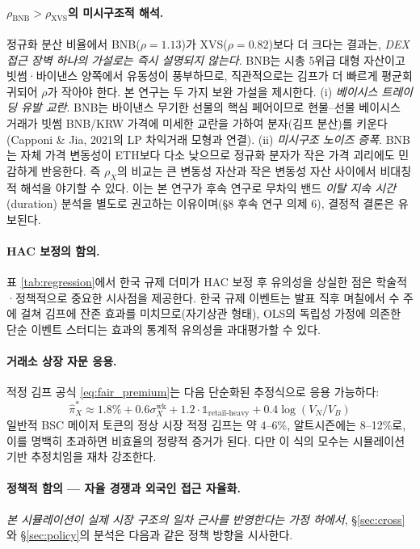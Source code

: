 \documentclass[11pt,a4paper]{article}
\begin{document}
\paragraph{$\rho_{\text{BNB}}>\rho_{\text{XVS}}$의 미시구조적 해석.}
정규화 분산 비율에서 BNB($\rho=1.13$)가 XVS($\rho=0.82$)보다 더 크다는 결과는,
\emph{DEX 접근 장벽 하나의 가설로는 즉시 설명되지 않는다}. BNB는 시총 5위급 대형 자산이고
빗썸·바이낸스 양쪽에서 유동성이 풍부하므로, 직관적으로는 김프가 더 빠르게 평균회귀되어
$\rho$가 작아야 한다. 본 연구는 두 가지 보완 가설을 제시한다.
(i) \emph{베이시스 트레이딩 유발 교란}. BNB는 바이낸스 무기한 선물의 핵심 페어이므로
현물--선물 베이시스 거래가 빗썸 BNB/KRW 가격에 미세한 교란을 가하여
분자(김프 분산)를 키운다(Capponi \& Jia, 2021의 LP 차익거래 모형과 연결).
(ii) \emph{미시구조 노이즈 증폭}. BNB는 자체 가격 변동성이 ETH보다 다소 낮으므로
정규화 분자가 작은 가격 괴리에도 민감하게 반응한다. 즉 $\rho_X$의 비교는
큰 변동성 자산과 작은 변동성 자산 사이에서 비대칭적 해석을 야기할 수 있다.
이는 본 연구가 후속 연구로 무차익 밴드 \emph{이탈 지속 시간}(duration) 분석을
별도로 권고하는 이유이며(§8 후속 연구 의제 6), 결정적 결론은 유보된다.

\paragraph{HAC 보정의 함의.}
표 \ref{tab:regression}에서 한국 규제 더미가 HAC 보정 후 유의성을 상실한 점은 학술적·정책적으로
중요한 시사점을 제공한다. 한국 규제 이벤트는 발표 직후 며칠에서 수 주에 걸쳐 김프에 잔존 효과를
미치므로(자기상관 형태), OLS의 독립성 가정에 의존한 단순 이벤트 스터디는 효과의 통계적 유의성을
과대평가할 수 있다.

\paragraph{거래소 상장 자문 응용.}
적정 김프 공식 \eqref{eq:fair_premium}는 다음 단순화된 추정식으로 응용 가능하다:
\begin{equation}
\hat{\pi}_X^* \approx 1.8\% + 0.6\sigma_X^{\text{wk}} + 1.2\cdot\mathbb{1}_{\text{retail-heavy}} + 0.4\log(V_N/V_B)
\end{equation}
일반적 BSC 메이저 토큰의 정상 시장 적정 김프는 약 4--6\%, 알트시즌에는 8--12\%로,
이를 명백히 초과하면 비효율의 정량적 증거가 된다. 다만 이 식의 모수는 시뮬레이션 기반 추정치임을
재차 강조한다.



\paragraph{정책적 함의 --- 자율 경쟁과 외국인 접근 자율화.}
\emph{본 시뮬레이션이 실제 시장 구조의 일차 근사를 반영한다는 가정 하에서},
\S\ref{sec:cross}와 \S\ref{sec:policy}의 분석은 다음과 같은 정책 방향을 시사한다.
\end{document}
